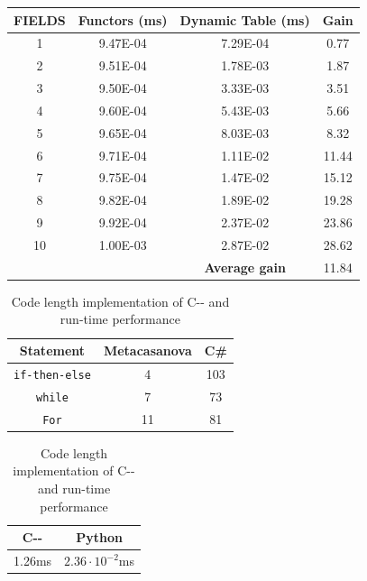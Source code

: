 \begin{table}
	\vspace{0.15cm}
	\begin{tabular}{|c|c|c|c|}
		\hline
		\textbf{FIELDS}& \textbf{Functors (ms)}&\textbf{Dynamic Table (ms)} & \textbf{Gain}\\ \hline
		1&	9.47E-04&	7.29E-04&	0.77\\ \hline
		2&	9.51E-04&	1.78E-03&	1.87\\ \hline
		3&	9.50E-04&	3.33E-03&	3.51\\ \hline
		4&	9.60E-04&	5.43E-03&	5.66\\ \hline
		5&	9.65E-04&	8.03E-03&	8.32\\ \hline
		6&	9.71E-04&	1.11E-02&	11.44\\ \hline
		7&	9.75E-04&	1.47E-02&	15.12\\ \hline
		8&	9.82E-04&	1.89E-02&	19.28\\ \hline
		9&	9.92E-04&	2.37E-02&	23.86\\ \hline
		10&	1.00E-03&	2.87E-02&	28.62\\ \hline
		\multicolumn{2}{c|}{} & \textbf{Average gain} & 11.84\\ \cline{3-4}						
	\end{tabular}
	\label{tab:functors}
\end{table}

\begin{table}
	\centering
	\caption{Code length implementation of C-{}- and run-time performance}
	\begin{tabular}{|c|c|c|}
		\hline
		\textbf{Statement} & \textbf{Metacasanova} & \textbf{C\#}\\
		\hline
		\texttt{if-then-else} & 4 & 103 \\
		\hline
		\texttt{while} & 7 & 73 \\
		\hline
		\texttt{For} & 11 & 81\\
		\hline
	\end{tabular}
	
	\vspace{0.15cm}
	\begin{tabular}{|c|c|}
		\hline
		\textbf{C-{}-} & \textbf{Python} \\
		\hline
		1.26ms & $2.36 \cdot 10^{-2}$ms \\
		\hline
	\end{tabular}
	\label{tab:cmm}
\end{table}

